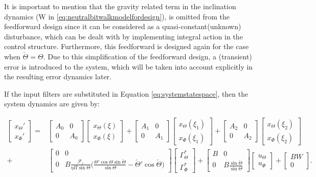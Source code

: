 \documentclass[main.tex]{subfiles}
\begin{document}
	It is important to mention that the gravity related term in the inclination dynamics (W in \eqref{eq:neutralbitwalkmodelfordesign}), is omitted from the feedforward design since it can be considered as a quasi-constant(unknown) disturbance, which can be dealt with by implementing integral action in the control structure. Furthermore, this feedforward is designed again for the case when $\check{\Theta} = \Theta$. Due to this simplification of the feedforward design, a (transient) error is introduced to the system, which will be taken into account explicitly in the resulting error dynamics later.

	
	If the input filters are substituted in Equation \eqref{eq:systemstatespace}, then the system dynamics are given by:
	
	\begin{align}
	\begin{bmatrix}
	x_\Theta' \\
	x_\Phi'
	\end{bmatrix} =&
	\begin{bmatrix}
	A_0 & 0 \\
	0 & A_0
	\end{bmatrix}
	\begin{bmatrix}
	x_\Theta(\xi) \\
	x_\Phi(\xi)
	\end{bmatrix} + 
	\begin{bmatrix}
	A_1 & 0 \\
	0 & A_1
	\end{bmatrix}
	\begin{bmatrix}
	x_\Theta(\xi_1) \\
	x_\Phi(\xi_1)
	\end{bmatrix} +
	\begin{bmatrix}
	A_2 & 0 \\
	0 & A_2
	\end{bmatrix}
	\begin{bmatrix}
	x_\Theta(\xi_2) \\
	x_\Phi(\xi_2)
	\end{bmatrix} \nonumber\\
	+& \begin{bmatrix}
	0 & 0 \\
	0 & B\frac{\mathcal{F}_r}{\eta \Pi \sin \Theta} \bigg( \frac{\Theta' \cos \Theta \sin \check{\Theta}}{\sin \Theta}  - \check{\Theta}' \cos \check{\Theta}\bigg)
	\end{bmatrix}
	\begin{bmatrix}
	\Gamma_\Theta^* \\
	\Gamma_\Phi^*
	\end{bmatrix} + \begin{bmatrix}
	B & 0 \\
	0 & B\frac{\sin \check{\Theta}}{\sin \Theta}
	\end{bmatrix}
	\begin{bmatrix}
	u_\Theta \\
	u_\Phi
	\end{bmatrix} +
	\begin{bmatrix}
	BW \\
	0
	\end{bmatrix}.
	\label{eq:systemstatespace2}	
	\end{align}
	
\end{document}

